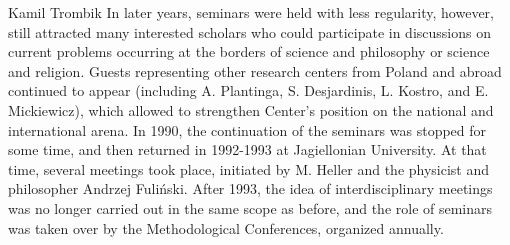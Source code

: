 \begin{artengenv}{Kamil Trombik}
In later years, seminars were held with less regularity, however, still attracted many interested scholars who could
participate in discussions on current problems occurring at the borders of science and philosophy or science and
religion. Guests representing other research centers from Poland and abroad continued to appear (including A.
Plantinga, S. Desjardinis, L. Kostro, and E. Mickiewicz), which allowed to strengthen Center's position on the national
and international arena. In 1990, the continuation of the seminars was stopped for some time, and then returned in
1992-1993 at Jagiellonian University. At that time, several meetings took place, initiated by M. Heller and the
physicist and philosopher Andrzej Fuliński. After 1993, the idea of interdisciplinary meetings was no longer carried
out in the same scope as before, and the role of seminars was taken over by the Methodological Conferences, organized
annually.


\end{artengenv}
